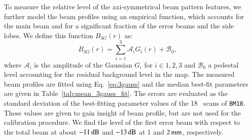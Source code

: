 {\lp To measure the relative level of the axi-symmetrical beam pattern
features, we further model the beam profiles using an empirical function,
which accounts for the main beam and for a significant fraction of the
error beams and the side lobes. We define this function $B_{3G}(r)$ as:
\begin{equation}
  B_{3G}(r) = \sum_{i=1}^{3} \mathcal{A}_i G_i(r) + \mathcal{B}_0,
  \label{eq:3gauss}
\end{equation}
where $\mathcal{A}_i$ is the amplitude of the Gaussian $G_i$ for
$i \in {1, 2, 3}$ and $\mathcal{B}_0$ a pedestal level accounting for
the residual background level in the map. The measured beam profiles
are fitted using Eq.~\ref{eq:3gauss} and the median best-fit
parameters are given in Table~\ref{tab:mean_3gauss_fit}. The errors
are evaluated as the standard deviation of the best-fitting parameter
values of the 18 \bm\ scans of {\tt BM18}.
These values are given to gain insight of beam profile, but are not
used for the calibration procedure. We find the level of the first error
beam with respect to the total beam at about $-11\,\rm{dB}$ and
$-13\,\rm{dB}$ at 1 and $2\,\rm{mm}$, respectively.}
%
